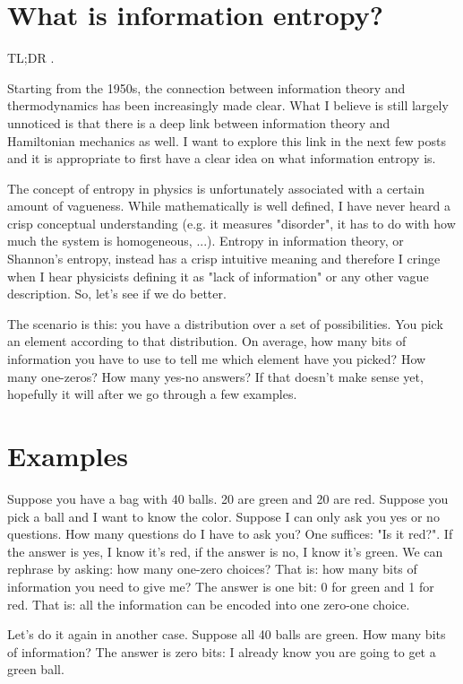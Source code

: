 \documentclass[aps,pra,10pt,floatfix,nofootinbib]{revtex4-1}
\theoremstyle{definition}
\begin{document}
	
\section{What is information entropy?}

TL;DR .

Starting from the 1950s, the connection between information theory and thermodynamics has been increasingly made clear. What I believe is still largely unnoticed is that there is a deep link between information theory and Hamiltonian mechanics as well. I want to explore this link in the next few posts and it is appropriate to first have a clear idea on what information entropy is.

The concept of entropy in physics is unfortunately associated with a certain amount of vagueness. While mathematically is well defined, I have never heard a crisp conceptual understanding (e.g. it measures "disorder", it has to do with how much the system is homogeneous, ...). Entropy in information theory, or Shannon's entropy, instead has a crisp intuitive meaning and therefore I cringe when I hear physicists defining it as "lack of information" or any other vague description. So, let's see if we do better.

The scenario is this: you have a distribution over a set of possibilities. You pick an element according to that distribution. On average, how many bits of information you have to use to tell me which element have you picked? How many one-zeros? How many yes-no answers? If that doesn't make sense yet, hopefully it will after we go through a few examples.

\section{Examples}

Suppose you have a bag with 40 balls. 20 are green and 20 are red. Suppose you pick a ball and I want to know the color. Suppose I can only ask you yes or no questions. How many questions do I have to ask you? One suffices: "Is it red?". If the answer is yes, I know it's red, if the answer is no, I know it's green. We can rephrase by asking: how many one-zero choices? That is: how many bits of information you need to give me? The answer is one bit: 0 for green and 1 for red. That is: all the information can be encoded into one zero-one choice.

Let's do it again in another case. Suppose all 40 balls are green. How many bits of information? The answer is zero bits: I already know you are going to get a green ball.
\end{document}
